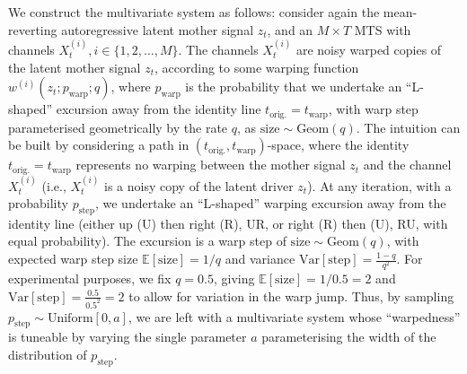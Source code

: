 \documentclass{article}
\theoremstyle{plain}
\theoremstyle{definition}
\theoremstyle{remark}
\begin{document}
We construct the multivariate system as follows: consider again the mean-reverting autoregressive latent mother signal $z_t$, and an $M \times T$ MTS with channels $X_t^{(i)}, i \in \{1,2,\dots,M\}$. The channels $X_t^{(i)}$ are noisy warped copies of the latent mother signal $z_t$, according to some warping function $w^{(i)}(z_t;p_{\mathrm{warp}};q)$, where $p_{\mathrm{warp}}$ is the probability that we undertake an “L-shaped” excursion away from the identity line $t_{\mathrm{orig.}} = t_{\mathrm{warp}}$, with warp step parameterised geometrically by the rate $q$, as $\mathrm{size} \sim \mathrm{Geom}(q)$. The intuition can be built by considering a path in $(t_{\mathrm{orig.}},t_{\mathrm{warp}})$-space, where the identity $t_{\mathrm{orig.}} = t_{\mathrm{warp}}$ represents no warping between the mother signal $z_t$ and the channel $X_t^{(i)}$ (i.e., $X_t^{(i)}$ is a noisy copy of the latent driver $z_t$). At any iteration, with a probability $p_{\mathrm{step}}$, we undertake an “L-shaped” warping excursion away from the identity line (either up (U) then right (R), UR, or right (R) then (U), RU, with equal probability). The excursion is a warp step of $\mathrm{size} \sim \mathrm{Geom}(q)$, with expected warp step size $\mathbb{E}[\mathrm{size}]=1/q$ and variance $\mathrm{Var}[\mathrm{step}] = \frac{1-q}{q^2}$. For experimental purposes, we fix $q = 0.5$, giving $\mathbb{E}[\mathrm{size}]=1/0.5=2$ and $\mathrm{Var}[\mathrm{step}] = \frac{0.5}{0.5^2}=2$ to allow for variation in the warp jump. Thus, by sampling $p_{\mathrm{step}} \sim \mathrm{Uniform}[0,a]$, we are left with a multivariate system whose “warpedness” is tuneable by varying the single parameter $a$ parameterising the width of the distribution of $p_{\mathrm{step}}$. 
\end{document}
